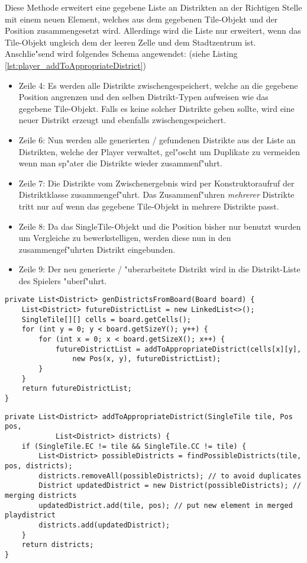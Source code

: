 Diese Methode erweitert eine gegebene Liste an Distrikten an der Richtigen Stelle mit einem neuen Element, welches aus dem gegebenen Tile-Objekt und der Position zusammengesetzt wird. Allerdings wird die Liste nur erweitert, wenn das Tile-Objekt ungleich dem der leeren Zelle und dem Stadtzentrum ist. Anschlie"send wird folgendes Schema angewendet:  (siehe Listing \ref{lst:player_addToAppropriateDistrict})
\begin{itemize}
	\item Zeile 4: Es werden alle Distrikte zwischengespeichert, welche an die gegebene Position angrenzen und den selben Distrikt-Typen aufweisen wie das gegebene Tile-Objekt. Falls es keine solcher Distrikte geben sollte, wird eine neuer Distrikt erzeugt und ebenfalls zwischengespeichert. 
	\item Zeile 6: Nun werden alle generierten / gefundenen Distrikte aus der Liste an Distrikten, welche der Player verwaltet, gel"oscht um Duplikate zu vermeiden wenn man sp"ater die Distrikte wieder zusammenf"uhrt.
	\item Zeile 7: Die Distrikte vom Zwischenergebnis wird per Konstruktoraufruf der Distriktklasse zusammengef"uhrt. Das Zusammenf"uhren \emph{mehrerer} Distrikte tritt nur auf wenn das gegebene Tile-Objekt in mehrere Distrikte passt. 
	\item Zeile 8: Da das SingleTile-Objekt und die Position bisher nur benutzt wurden um Vergleiche zu bewerkstelligen, werden diese nun in den zusammengef"uhrten Distrikt eingebunden. 
	\item Zeile 9: Der neu generierte / "uberarbeitete Distrikt wird in die Distrikt-Liste des Spielers "uberf"uhrt. 
\end{itemize}
\begin{lstlisting}[style=CodeHighlighting,float,caption=Player - genDistrictsFromBoard,label=lst:player_genDistrictsFromBoard]
private List<District> genDistrictsFromBoard(Board board) {
    List<District> futureDistrictList = new LinkedList<>();
    SingleTile[][] cells = board.getCells();
    for (int y = 0; y < board.getSizeY(); y++) {
        for (int x = 0; x < board.getSizeX(); x++) {
            futureDistrictList = addToAppropriateDistrict(cells[x][y], 
            	new Pos(x, y), futureDistrictList);
        }
    }
    return futureDistrictList;
}
\end{lstlisting}
\begin{lstlisting}[style=CodeHighlighting,float,caption=Player - addToAppropriateDistrict,label=lst:player_addToAppropriateDistrict]
private List<District> addToAppropriateDistrict(SingleTile tile, Pos pos, 
			List<District> districts) {
    if (SingleTile.EC != tile && SingleTile.CC != tile) {
        List<District> possibleDistricts = findPossibleDistricts(tile, pos, districts);
        districts.removeAll(possibleDistricts); // to avoid duplicates
        District updatedDistrict = new District(possibleDistricts); // merging districts
        updatedDistrict.add(tile, pos); // put new element in merged playdistrict
        districts.add(updatedDistrict);
    }
    return districts;
}
\end{lstlisting}
